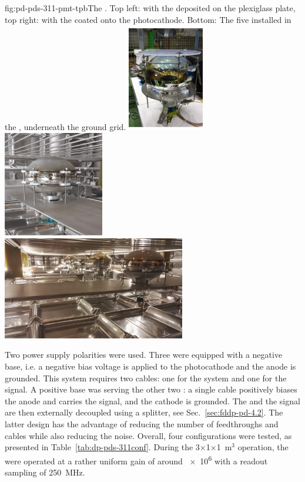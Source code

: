 \begin{dunefigure}{fig:pd-pds-311-pmt-tpb}{The  . Top left:  with the  deposited on the plexiglass plate, top right:  with the  coated onto the photocathode. Bottom: The five  installed in the , underneath the ground grid.}
\includegraphics[width=0.25\textwidth]{graphics/dppd_PMTPlate}
\includegraphics[width=0.33\textwidth]{graphics/dppd_PMTTPB.jpeg}\\
\includegraphics[width=0.6\textwidth]{graphics/dppd_PMT_311_installation.jpg}
\end{dunefigure}

Two power supply polarities were used. Three  were equipped with a negative  base, i.e. a negative bias voltage is applied to the photocathode and the anode is grounded. This system requires two cables: one for the  system and one for the signal. A positive base was serving the other two : a single cable positively biases the anode and carries the signal, and the cathode is grounded. The  and the signal are then externally decoupled using a splitter, see Sec.~\ref{sec:fddp-pd-4.2}. The latter design has the advantage of reducing the number of feedthroughs and cables while also reducing the noise. Overall, four configurations were tested, as presented in Table~\ref{tab:dp-pds-311conf}. During the 3$\times$1$\times$1~m$^3$ operation, the  were operated at a rather uniform gain of around \num{e6} with a readout sampling of \SI{250}{MHz}.

